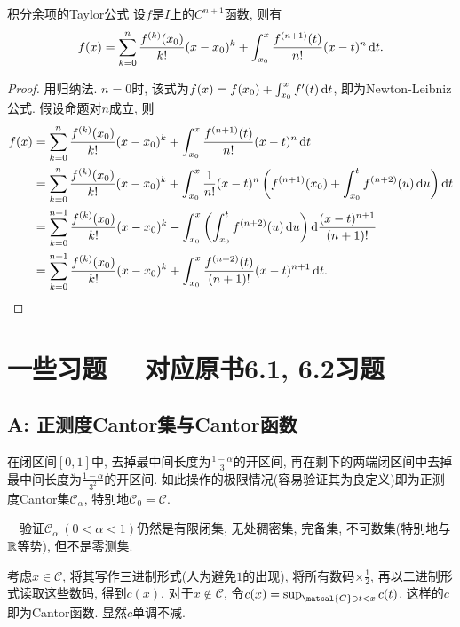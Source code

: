 \begin{proposition}{积分余项的Taylor公式}
	设$f$是$I$上的$C^{n+1}$函数, 则有$$f(x)=\sum_{k=0}^{n} \frac{f^{(k)}(x_0)}{k!} (x-x_0)^k + \int_{x_0}^{x} \frac{f^{(n+1)}(t)}{n!} (x-t)^n \mathop{}\!\mathrm{d} t.$$
\end{proposition}
\begin{proof}
	用归纳法. $n=0$时, 该式为$f(x)=f(x_0)+\int_{x_0}^{x} f'(t) \mathop{}\!\mathrm{d} t$, 即为Newton-Leibniz公式. 假设命题对$n$成立, 则
	\begin{align*}
		f(x) &= \sum_{k=0}^{n} \frac{f^{(k)}(x_0)}{k!} (x-x_0)^k + \int_{x_0}^{x} \frac{f^{(n+1)}(t)}{n!} (x-t)^n \mathop{}\!\mathrm{d} t \\
		&= \sum_{k=0}^{n} \frac{f^{(k)}(x_0)}{k!} (x-x_0)^k + \int_{x_0}^{x} \frac{1}{n!} (x-t)^n \left( f^{(n+1)}(x_0) + \int_{x_0}^{t} f^{(n+2)} (u) \mathop{}\!\mathrm{d} u \right) \mathop{}\!\mathrm{d} t \\
		&= \sum_{k=0}^{n+1} \frac{f^{(k)}(x_0)}{k!} (x-x_0)^k - \int_{x_0}^{x} \left( \int_{x_0}^{t} f^{(n+2)} (u) \mathop{}\!\mathrm{d} u \right) \mathop{}\!\mathrm{d} \frac{(x-t)^{n+1}}{(n+1)!} \\
		&= \sum_{k=0}^{n+1} \frac{f^{(k)}(x_0)}{k!} (x-x_0)^k + \int_{x_0}^{x} \frac{f^{(n+2)}(t)}{(n+1)!} (x-t)^{n+1} \mathop{}\!\mathrm{d} t.
	\end{align*}
\end{proof}

\newpage
\section*{一些习题 ~~\small 对应原书6.1, 6.2习题} \label{sec:ex7.1}

\subsection*{A: 正测度Cantor集与Cantor函数}

在闭区间$[0,1]$中, 去掉最中间长度为$\frac{1-\alpha}{3}$的开区间, 再在剩下的两端闭区间中去掉最中间长度为$\frac{1-\alpha}{3^2}$的开区间. 如此操作的极限情况(容易验证其为良定义)即为正测度Cantor集$\mathcal{C}_\alpha$, 特别地$\mathcal{C}_0=\mathcal{C}$. 
\vspace{1em}

~~验证$\mathcal{C}_\alpha~(0<\alpha<1)$仍然是有限闭集, 无处稠密集, 完备集, 不可数集(特别地与$\mathbb{R}$等势), 但不是零测集. 
\vspace{1em}

考虑$x \in \mathcal{C}$, 将其写作三进制形式(人为避免$1$的出现), 将所有数码$\times \frac{1}{2}$, 再以二进制形式读取这些数码, 得到$c(x)$. 对于$x \notin \mathcal{C}$, 令$c(x)=\sup_{\matcal{C} \ni t<x} c(t)$. 这样的$c$即为Cantor函数. 显然$c$单调不减. 

